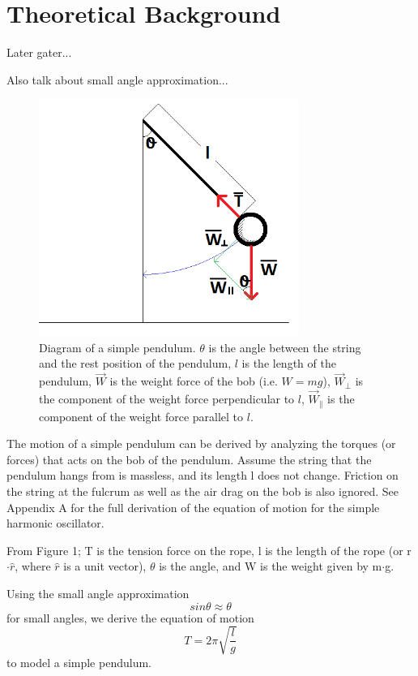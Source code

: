 \documentclass[iop]{emulateapj}
\begin{document}
\section{Theoretical Background}
\label{sec:theory}


Later gater...

Also talk about small angle approximation...


\begin{figure}[H]
\centering
\includegraphics[width=85mm]{../../Images/FreebodyDiagram.png}
\caption{Diagram of a simple pendulum. 
$\theta$ is the angle between the string
and the rest position of the pendulum, $l$ is the length of the pendulum,
$\vec{W}$ is the weight force of the bob (i.e. $W = mg$), $\vec{W}_\perp$ is the 
component of the weight force perpendicular to $l$, $\vec{W}_\parallel$ 
is the component of the weight force parallel to $l$.}
\label{Pendulum}
\end{figure}


The motion of a simple pendulum can be derived by analyzing the torques (or forces) that acts 
on the bob of the pendulum. Assume the string that the pendulum hangs from is massless, and
its length l does not change. Friction on the string at the fulcrum as well as the
air drag on the bob is also ignored. See Appendix A for the full derivation
of the equation of motion for the simple harmonic oscillator.


From Figure 1; T is the tension force on the rope, l is the length of the
rope (or r$\cdot\hat{r}$, where $\hat{r}$ is a unit vector), $\theta$ is the angle, and W is the weight given by m$\cdot$g.


Using the small angle approximation
\begin{equation}
\boxed{sin\theta \approx \theta}
\end{equation}
for small angles, we derive the equation of motion
\begin{equation}
\boxed{T = 2\pi\sqrt{\frac{l}{g}}}
\end{equation}
to model a simple pendulum.
\end{document}
